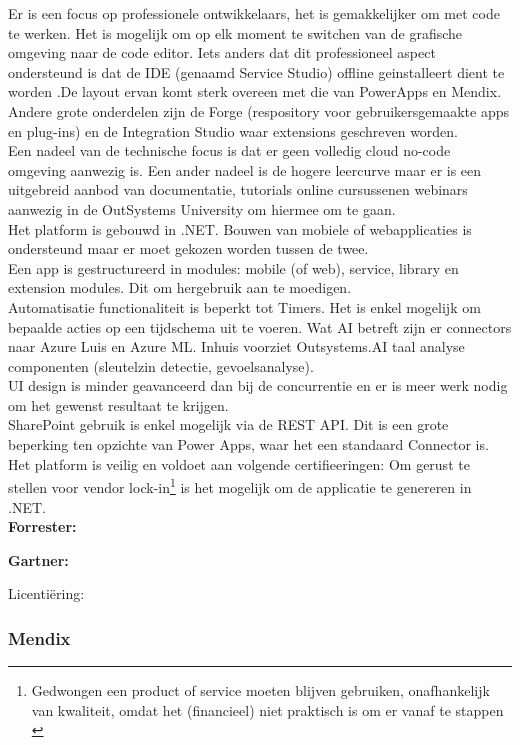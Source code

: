 Er is een focus op professionele ontwikkelaars, het is gemakkelijker om met code te werken. Het is mogelijk om op elk moment te switchen van de grafische omgeving naar de code editor. Iets anders dat dit professioneel aspect ondersteund is dat de IDE (genaamd Service Studio) offline geinstalleert dient te worden .De layout ervan komt sterk overeen met die van PowerApps en Mendix. Andere grote onderdelen zijn de Forge (respository voor gebruikersgemaakte apps en plug-ins) en de Integration Studio waar extensions geschreven worden.\\
Een nadeel van de technische focus is dat er geen volledig cloud no-code omgeving aanwezig is. Een ander nadeel is de hogere leercurve maar er is een uitgebreid aanbod van documentatie, tutorials online cursussenen webinars aanwezig in de OutSystems University om hiermee om te gaan.\\
Het platform is gebouwd in .NET. Bouwen van mobiele of webapplicaties is ondersteund maar er moet gekozen worden tussen de twee.\\
Een app is gestructureerd in modules: mobile (of web), service, library en extension modules. Dit om hergebruik aan te moedigen.\\
Automatisatie functionaliteit is beperkt tot Timers. Het is enkel mogelijk om bepaalde acties op een tijdschema uit te voeren. Wat AI betreft zijn er connectors naar Azure Luis en Azure ML. Inhuis voorziet Outsystems.AI taal analyse componenten (sleutelzin detectie, gevoelsanalyse).\\
UI design is minder geavanceerd dan bij de concurrentie en er is meer werk nodig om het gewenst resultaat te krijgen.\\
SharePoint gebruik is enkel mogelijk via de REST API. Dit is een grote beperking ten opzichte van Power Apps, waar het een standaard Connector is.\\
Het platform is veilig en voldoet aan volgende certifieeringen: %
Om gerust te stellen voor vendor lock-in\footnote{Gedwongen een product of service moeten blijven gebruiken, onafhankelijk van kwaliteit, omdat het (financieel) niet praktisch is om er vanaf te stappen \autocite{Cloudflare}} is het mogelijk om de applicatie te genereren in .NET.\\

\textbf{Forrester:} 

\textbf{Gartner:} 

Licentiëring:  

\subsubsection{Mendix}

